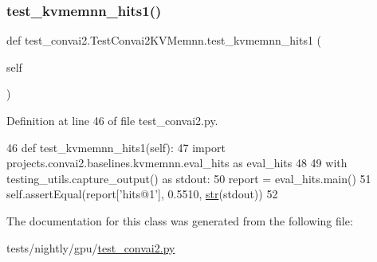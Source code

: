 \subsubsection{\texorpdfstring{test\+\_\+kvmemnn\+\_\+hits1()}{test\_kvmemnn\_hits1()}}
{\footnotesize\ttfamily def test\+\_\+convai2.\+Test\+Convai2\+K\+V\+Memnn.\+test\+\_\+kvmemnn\+\_\+hits1 (\begin{DoxyParamCaption}\item[{}]{self }\end{DoxyParamCaption})}



Definition at line 46 of file test\+\_\+convai2.\+py.


\begin{DoxyCode}
46     \textcolor{keyword}{def }test\_kvmemnn\_hits1(self):
47         \textcolor{keyword}{import} projects.convai2.baselines.kvmemnn.eval\_hits \textcolor{keyword}{as} eval\_hits
48 
49         with testing\_utils.capture\_output() \textcolor{keyword}{as} stdout:
50             report = eval\_hits.main()
51         self.assertEqual(report[\textcolor{stringliteral}{'hits@1'}], 0.5510, \hyperlink{namespacegenerate__task__READMEs_a5b88452ffb87b78c8c85ececebafc09f}{str}(stdout))
52 
\end{DoxyCode}


The documentation for this class was generated from the following file\+:\begin{DoxyCompactItemize}
\item 
tests/nightly/gpu/\hyperlink{test__convai2_8py}{test\+\_\+convai2.\+py}\end{DoxyCompactItemize}
